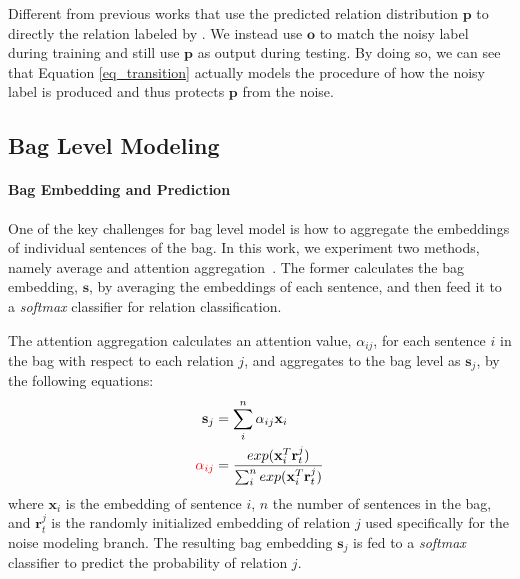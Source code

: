 Different from previous works that use the predicted relation distribution $\mathbf{p}$ to directly  the relation labeled by \DS{}. We instead use $\mathbf{o}$ to match the noisy label during training and still use $\mathbf{p}$ as output during testing. 
By doing so, we can see that Equation \ref{eq_transition} actually models the procedure of how the noisy label is produced and thus protects $\mathbf{p}$ from the noise.

\subsection{Bag Level Modeling}
\paragraph{Bag Embedding and Prediction}
One of the key challenges for bag level model is how to aggregate the embeddings of individual sentences of the bag.  
In this work, we experiment two methods, namely average and attention aggregation~\cite{lin2016neural}. 
The former calculates the bag embedding, $\mathbf{s}$, by averaging the embeddings of each sentence, and  then feed it to a \emph{softmax} classifier for relation classification.

The attention aggregation calculates an attention value, $\alpha_{ij}$, for each sentence $i$ in the bag with respect to each relation $j$, and aggregates to  the bag level as  $\mathbf{s}_j$, by the following equations:
\begin{equation}
\begin{aligned}
\mathbf{s}_j &= \sum_i^{n}{\alpha_{ij} \mathbf{x}_{i}}\\
\textcolor{red}{\alpha_{ij}} &= \frac{exp(\mathbf{x}_i^T \mathbf{r}_t^j)}{\sum_i^n{exp(\mathbf{x}_i^T \mathbf{r}_t^j)}}
\end{aligned}
\label{eq_att_bag_embed}
\end{equation}
where $\mathbf{x}_{i}$ is the embedding of sentence $i$, $n$ the number of sentences in the bag, and $\mathbf{r}_t^j$ is the randomly initialized embedding of relation $j$ used specifically for the noise modeling branch.%
The resulting bag embedding $\mathbf{s}_j$ is fed to a \emph{softmax} classifier to predict the probability of relation $j$. 

